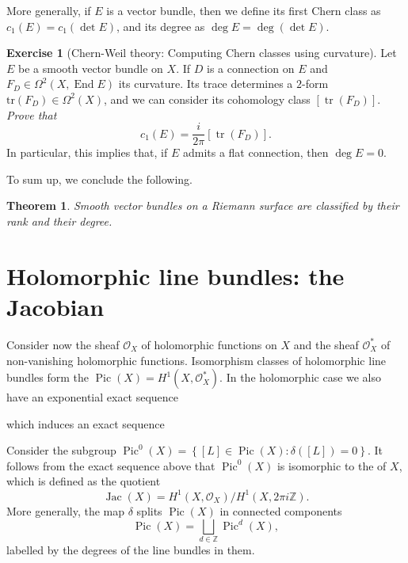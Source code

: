 \documentclass[12pt,a4paper]{amsbook}
\newtheorem{thm}{Theorem}[chapter]
\theoremstyle{remark} \newtheorem{rmk}[thm]{Remark}
\theoremstyle{definition} \newtheorem{defn}[thm]{Definition}
\theoremstyle{definition} \newtheorem{ex}[thm]{Example}
\theoremstyle{definition} \newtheorem{ej}{Exercise}
\let\emph\relax
\newcommand{\Z}{\mathbb Z}
\newcommand{\sO}{\mathscr O}
\DeclareMathOperator{\Pic}{Pic}
\DeclareMathOperator{\Jac}{Jac}
\DeclareMathOperator{\End}{End}
\DeclareMathOperator{\tr}{tr}
\begin{document}
More generally, if $E$ is a vector bundle, then we define its first Chern class as $c_1(E)=c_1(\det E)$, and its degree as $\deg E = \deg(\det E)$.

\begin{ej}[Chern-Weil theory: Computing Chern classes using curvature]
Let $E$ be a smooth vector bundle on $X$. If $D$ is a connection on $E$ and $F_D \in \Omega^2(X,\End E)$ its curvature. Its trace determines a  $2$-form $\mathrm{tr}(F_D)\in \Omega^2(X)$, and we can consider its cohomology class $[\tr(F_D)]$.
\textit{Prove that}
\begin{equation*}
c_1(E) = \frac{i}{2\pi} [\tr(F_D)].
\end{equation*} 
In particular, this implies that, if $E$ admits a flat connection, then $\deg E = 0$.
\end{ej}

To sum up, we conclude the following.
\begin{thm}
Smooth vector bundles on a Riemann surface are classified by their rank and their degree.
\end{thm}

\section{Holomorphic line bundles: the Jacobian}
Consider now the sheaf $\sO_X$ of holomorphic functions on $X$ and the sheaf $\sO^*_X$ of non-vanishing holomorphic functions.  Isomorphism classes of holomorphic line bundles form the \emph{Picard group} $\Pic(X)=H^1(X,\sO_X^*)$. In the holomorphic case we also have an exponential exact sequence
\begin{center}
\end{center}
which induces an exact sequence
\begin{center}
\end{center}
Consider the subgroup $\Pic^0(X)=\left\{[L]\in \Pic(X): \delta([L])=0\right\}$. It follows from the exact sequence above that $\Pic^0(X)$ is isomorphic to the \emph{Jacobian} of $X$, which is defined as the quotient
\begin{equation*}
\Jac(X) = H^1(X,\sO_X)/H^1(X,2\pi i \Z).
\end{equation*}
More generally, the map $\delta$ splits $\Pic(X)$ in connected components
\begin{equation*}
\Pic(X) = \bigsqcup_{d\in \Z} \Pic^d(X),
\end{equation*}
labelled by the degrees of the line bundles in them.
\end{document}
